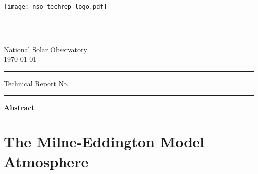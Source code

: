 \documentclass[11pt]{article}
\newcommand{\noheadrule}{0cm}
\renewcommand{\headrule}{{\hrule width\headwidth height\noheadrule}}
\begin{document}
\begin{figure*}[h]
\begin{center}
\vspace{-1.0cm}
\texttt{[image: nso\_techrep\_logo.pdf]}
\end{center}
\end{figure*}
\begin{center}
\vspace{1.0cm}
\begin{LARGE}
\textbf{\trcvrttl}\\
\end{LARGE}
\vspace{1.5cm}
\begin{large}
\trauthor\\
\vspace{0.5cm}
National Solar Observatory\\
\vspace{1.5cm}
\today\\
\vspace{1.5cm}
\hrule
\vspace{0.35cm}
Technical Report No. \textbf{\trnumber}
\vspace{0.25cm}
\hrule
\end{large}
\end{center}

\vfill
\begin{center}
\begin{Large}
\bf{Abstract}
\end{Large}
\end{center}
\begin{quote}
\trabstct
\end{quote}


\clearpage
\renewcommand{\headrule}{{\hrule width\headwidth height\headrulewidth\vskip0.5cm}}
\fancyhead{}
\fancyhead[L]{\trhdrttl}
\fancyhead[R]{\thepage}
\fancyfoot{}
\thispagestyle{fancy}
\vspace*{-0.40cm}


\tableofcontents        %



\clearpage
\section{The Milne-Eddington Model Atmosphere}\label{s:me-model}
\end{document}
